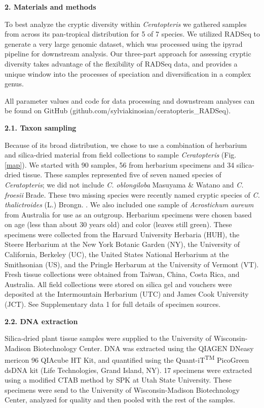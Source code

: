 \documentclass[12pt]{article}
\begin{document}
\begin{flushleft}
\vspace{1cm}

{\large\textbf{2. Materials and methods}}

To best analyze the cryptic diversity within \textit{Ceratopteris} we gathered samples from across its pan-tropical distribution for 5 of 7 species. We utilized RADSeq to generate a very large genomic dataset, which was processed using the ipyrad pipeline \autocite{Eaton2020} for downstream analysis. Our three-part approach for assessing cryptic diversity takes advantage of the flexibility of RADSeq data, and provides a unique window into the processes of speciation and diversification in a complex genus. 

All parameter values and code for data processing and downstream analyses can be found on GitHub (github.com/sylviakinosian/ceratopteris\_RADSeq).

\textbf{2.1. Taxon sampling}

Because of its broad distribution, we chose to use a combination of herbarium and silica-dried material from field collections to sample \textit{Ceratopteris} (Fig. \ref{map}). We started with 90 samples, 56 from herbarium specimens and 34 silica-dried tissue. These samples represented five of seven named species of \textit{Ceratopteris}; we did not include \textit{C. oblongiloba} Masuyama \& Watano and \textit{C. froesii} Brade. These two missing species were recently named cryptic species of \textit{C. thalictroides} (L.) Brongn. \autocite{Masuyama2010}. We also included one sample of \textit{Acrostichum aureum} from Australia for use as an outgroup. Herbarium specimens were chosen based on age (less than about 30 years old) and color (leaves still green). These specimens were collected from the Harvard University Herbaria (HUH), the Steere Herbarium at the New York Botanic Garden (NY), the University of California, Berkeley (UC), the United States National Herbarium at the Smithsonian (US), and the Pringle Herbarum at the University of Vermont (VT). Fresh tissue collections were obtained from Taiwan, China, Costa Rica, and Australia. All field collections were stored on silica gel and vouchers were deposited at the Intermountain Herbarium (UTC) and James Cook University (JCT). See Supplementary data 1 for full details of specimen sources.

\textbf{2.2. DNA extraction}

Silica-dried plant tissue samples were supplied to the University of Wisconsin-Madison Biotechnology Center. DNA was extracted using the QIAGEN DNeasy mericon 96 QIAcube HT Kit, and quantified using the Quant-iT\textsuperscript{TM} PicoGreen\textsuperscript{\textregistered} dsDNA kit (Life Technologies, Grand Island, NY). 17 specimens were extracted using a modified CTAB method \autocite{Doyle1987} by SPK at Utah State University. These specimens were send to the University of Wisconsin-Madison Biotechnology Center, analyzed for quality and then pooled with the rest of the samples.


\end{flushleft}
\end{document}
